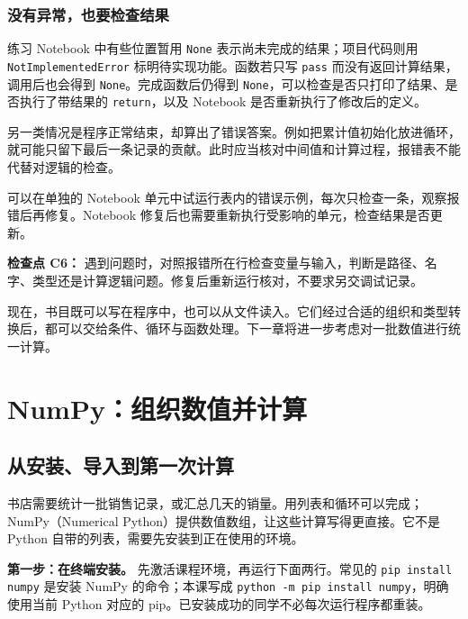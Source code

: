 \documentclass[UTF8,a4paper,11pt,fontset=fandol]{ctexart}
\providecommand{\passthrough}[1]{#1}
\begin{document}
\subsubsection{没有异常，也要检查结果}\label{ux6ca1ux6709ux5f02ux5e38ux4e5fux8981ux68c0ux67e5ux7ed3ux679c}

练习 Notebook 中有些位置暂用 \passthrough{\lstinline!None!} 表示尚未完成的结果；项目代码则用 \passthrough{\lstinline!NotImplementedError!} 标明待实现功能。函数若只写 \passthrough{\lstinline!pass!} 而没有返回计算结果，调用后也会得到 \passthrough{\lstinline!None!}。完成函数后仍得到 \passthrough{\lstinline!None!}，可以检查是否只打印了结果、是否执行了带结果的 \passthrough{\lstinline!return!}，以及 Notebook 是否重新执行了修改后的定义。

另一类情况是程序正常结束，却算出了错误答案。例如把累计值初始化放进循环，就可能只留下最后一条记录的贡献。此时应当核对中间值和计算过程，报错表不能代替对逻辑的检查。

可以在单独的 Notebook 单元中试运行表内的错误示例，每次只检查一条，观察报错后再修复。Notebook 修复后也需要重新执行受影响的单元，检查结果是否更新。

\textbf{检查点 C6：} 遇到问题时，对照报错所在行检查变量与输入，判断是路径、名字、类型还是计算逻辑问题。修复后重新运行核对，不要求另交调试记录。

现在，书目既可以写在程序中，也可以从文件读入。它们经过合适的组织和类型转换后，都可以交给条件、循环与函数处理。下一章将进一步考虑对一批数值进行统一计算。

\clearpage

\section{NumPy：组织数值并计算}\label{numpyux7ec4ux7ec7ux6570ux503cux5e76ux8ba1ux7b97}

\subsection{从安装、导入到第一次计算}\label{ux4eceux5b89ux88c5ux5bfcux5165ux5230ux7b2cux4e00ux6b21ux8ba1ux7b97}

书店需要统计一批销售记录，或汇总几天的销量。用列表和循环可以完成；NumPy（Numerical Python）提供数值数组，让这些计算写得更直接。它不是 Python 自带的列表，需要先安装到正在使用的环境。

\textbf{第一步：在终端安装。} 先激活课程环境，再运行下面两行。常见的 \passthrough{\lstinline!pip install numpy!} 是安装 NumPy 的命令；本课写成 \passthrough{\lstinline!python -m pip install numpy!}，明确使用当前 Python 对应的 pip。已安装成功的同学不必每次运行程序都重装。
\end{document}
